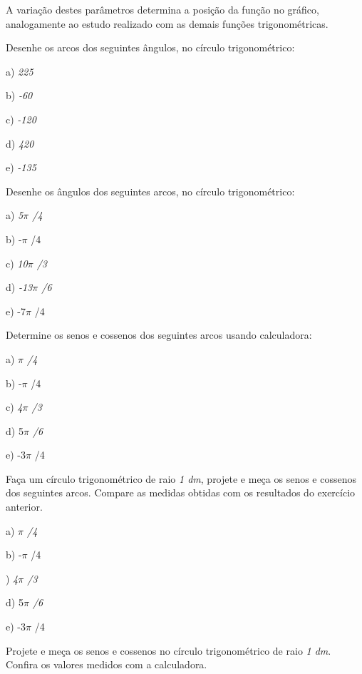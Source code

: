 A variação destes parâmetros determina a posição da função no gráfico, analogamente ao estudo realizado com as demais funções trigonométricas.

\begin{exercicios}
\item Desenhe os arcos dos seguintes ângulos, no círculo trigonométrico:

a) \textit{225\degree}

b) \textit{-60\degree }

c) \textit{-120\degree}

d) \textit{420\degree}

e) \textit{-135\degree}

\item Desenhe os ângulos dos seguintes arcos, no círculo trigonométrico:

a) \textit{5$ \pi $ /4}

b) -$ \pi $ /4

c) \textit{10$ \pi $ /3}

d) \textit{-13$ \pi $ /6}

e) -7$ \pi $ /4

\item Determine os senos e cossenos dos seguintes arcos usando calculadora:

a) \textit{ $ \pi $ /4}

b) -$ \pi $ /4

c) \textit{4$ \pi $ /3}

d) 5\textit{$ \pi $ /6\tab }

e) -3$ \pi $ /4

\item Faça um círculo trigonométrico de raio \textit{1 dm}, projete e meça os senos e cossenos dos seguintes arcos. Compare as medidas obtidas com os resultados do exercício anterior.

a) \textit{$ \pi $ /4}

b) -$ \pi $ /4

) \textit{4$ \pi $ /3}

d) 5\textit{$ \pi $ /6}

e) -3$ \pi $ /4

\item Projete e meça os senos e cossenos no círculo trigonométrico de raio \textit{1 dm}. Confira os valores medidos com a calculadora.


\end{exercicios}
